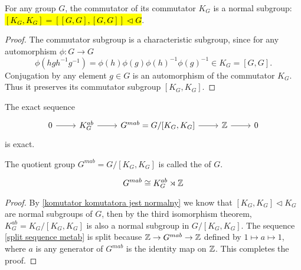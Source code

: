 \begin{lemma}\label{komutator komutatora jest normalny}
  For any group $G$, the commutator of its commutator $K_G$ is a normal subgroup: \hl{$[K_G, K_G]=[[G, G], [G, G]]\triangleleft G$}. 
\end{lemma}

\begin{proof}
  The commutator subgroup is a characteristic subgroup, since for any automorphism $\phi:G\to G$ 
  $$\phi(hgh^{-1}g^{-1})=\phi(h)\phi(g)\phi(h)^{-1}\phi(g)^{-1}\in K_G=[G, G].$$
  Conjugation by any element $g\in G$ is an automorphism of the commutator $K_G$. Thus it preserves its commutator subgroup $[K_G, K_G]$. 
\end{proof}

The exact sequence
\begin{equation}\label{split sequence metab}
  \begin{tikzcd}
    0\arrow[r] & K_G^{ab} \arrow[r] & G^{mab}=G/[K_G, K_G]\arrow[r] & \Z \arrow[r] & 0
  \end{tikzcd}
\end{equation}
is exact.


\begin{definition}[metabelianization]\label{metab def}
  The quotient group $G^{mab}=G/[K_G, K_G]$ is called the  of $G$. 
\end{definition}

\begin{proposition}\label{dzialanie na KG}
  $$G^{mab}\cong K_G^{ab}\rtimes \operatorname{\mathbb{Z}}$$
\end{proposition}

\begin{proof}
  By \cref{komutator komutatora jest normalny} we know that $[K_G, K_G]\triangleleft K_G$ are normal subgroups of $G$, then by the third isomorphism theorem, $K_G^{ab}=K_G/[K_G, K_G]$ is also a normal subgroup in $G/[K_G, K_G]$.
  The sequence \eqref{split sequence metab} is split because $\operatorname{\mathbb{Z}}\to G^{mab}\to\operatorname{\mathbb{Z}}$ defined by $1\mapsto a\mapsto 1$, where $a$ is any generator of $G^{mab}$ is the identity map on $\operatorname{\mathbb{Z}}$. This completes the proof.
\end{proof}

